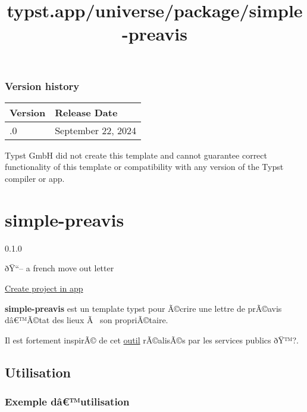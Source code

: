 \subsubsection{Version history}\label{version-history}

\begin{longtable}[]{@{}ll@{}}
\toprule\noalign{}
Version & Release Date \\
\midrule\noalign{}
\endhead
\bottomrule\noalign{}
\endlastfoot
0.5.0 & September 22, 2024 \\
\end{longtable}

Typst GmbH did not create this template and cannot guarantee correct
functionality of this template or compatibility with any version of the
Typst compiler or app.


\title{typst.app/universe/package/simple-preavis}

\label{banner}
\label{template-thumbnail}

\section{simple-preavis}\label{simple-preavis}

{ 0.1.0 }

ðŸ``-- a french move out letter

\href{/app?template=simple-preavis&version=0.1.0}{Create project in app}

\label{readme}
\textbf{simple-preavis} est un template typst pour Ã©crire une lettre de
prÃ©avis dâ€™Ã©tat des lieux Ã~ son propriÃ©taire.

Il est fortement inspirÃ© de cet
\href{https://www.service-public.fr/simulateur/calcul/CongeLogement}{outil}
rÃ©alisÃ©s par les services publics ðŸ™?.

\subsection{Utilisation}\label{utilisation}

\subsubsection{Exemple dâ€™utilisation}\label{exemple-duxe2utilisation}

